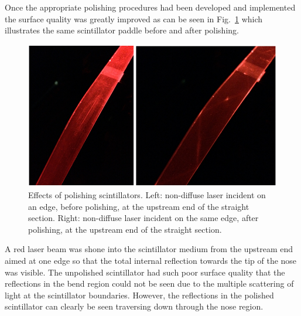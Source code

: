 Once the appropriate polishing procedures had been developed and implemented the surface quality was greatly improved as can be seen in Fig.~\ref{fig:polshing_effects} which illustrates the same scintillator paddle before and after polishing.
\begin{figure}[!htb]
	\centering
	\includegraphics[width=1.0\columnwidth]{fabrication/figs/polshing_effects}
	\caption[Effects of polishing scintillators]{Effects of polishing scintillators. Left: non-diffuse laser incident on an edge, before polishing, at the upstream end of the straight section. Right: non-diffuse laser incident on the same edge, after polishing, at the upstream end of the straight section.}
	\label{fig:polshing_effects}
\end{figure}
A red laser beam was shone into the scintillator medium from the upstream end aimed at one edge so that the total internal reflection towards the tip of the nose was visible.  The unpolished scintillator had such poor surface quality that the reflections in the bend region could not be seen due to the multiple scattering of light at the scintillator boundaries.  However, the reflections in the polished scintillator can clearly be seen traversing down through the nose region.

